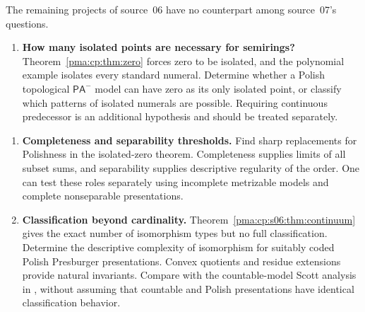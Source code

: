 \documentclass[11pt]{article}
\numberwithin{equation}{section}
\theoremstyle{definition}
\theoremstyle{remark}
\newcommand{\PAminus}{\mathsf{PA}^{-}}
\begin{document}
The remaining projects of source~06 have no counterpart among source~07's
questions.

\begin{enumerate}[label=\textbf{\arabic*.},leftmargin=*,start=5]

\item \textbf{How many isolated points are necessary for semirings?}
Theorem~\ref{pma:cp:thm:zero} forces zero to be isolated, and the
polynomial example isolates every standard numeral. Determine
whether a Polish topological $\PAminus$ model can have zero as its
only isolated point, or classify which patterns of isolated
numerals are possible. Requiring continuous predecessor is an
additional hypothesis and should be treated separately.

\end{enumerate}

\begin{enumerate}[label=\textbf{\arabic*.},leftmargin=*,start=7]

\item \textbf{Completeness and separability thresholds.}
Find sharp replacements for Polishness in the isolated-zero
theorem. Completeness supplies limits of all subset sums, and
separability supplies descriptive regularity of the order. One
can test these roles separately using incomplete metrizable
models and complete nonseparable presentations.

\item \textbf{Classification beyond cardinality.}
Theorem~\ref{pma:cp:s06:thm:continuum} gives the exact number of isomorphism
types but no full classification. Determine the descriptive
complexity of isomorphism for suitably coded Polish Presburger
presentations. Convex quotients and residue extensions provide
natural invariants. Compare with the countable-model Scott
analysis in \cite{Block}, without assuming that countable and
Polish presentations have identical classification behavior.

\end{enumerate}
\end{document}
